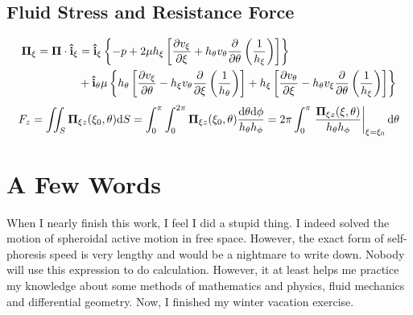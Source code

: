 \documentclass[fontsize=11pt, %
                             paper=a4, %
                             twoside, %
                             captions=tableheading,
                             index=totoc,
                             hyperref]{labbook}
\begin{document}
\subsection{Fluid Stress and Resistance Force}
\begin{equation}
\begin{aligned}
\mbox{\boldmath$ \Pi $}_\xi=\mbox{\boldmath$ \Pi $} \cdot \mathbf{\hat{i}}_\xi&=
\mathbf{\hat{i}}_\xi \left\{-p+2\mu h_\xi \left[\frac{\partial v_\xi}{\partial \xi}+h_\theta v_\theta \frac{\partial }{\partial \theta}\left(\frac{1}{h_\xi}\right)\right]\right\}\\
&+\mathbf{\hat{i}}_\theta \mu \left\{h_\theta\left[\frac{\partial v_\xi}{\partial \theta}-h_\xi v_\theta \frac{\partial }{\partial \xi}\left(\frac{1}{h_\theta}\right)\right]+h_\xi\left[\frac{\partial v_\theta}{\partial \xi}-h_\theta v_\xi \frac{\partial }{\partial \theta}\left(\frac{1}{h_\xi}\right)\right]\right\}
\end{aligned}
\end{equation}
\begin{equation}
F_z=\iint_S\mbox{\boldmath$ \Pi $}_{\xi z}(\xi_0,\theta)\mathrm{d}S=\int_0^\pi\int_0^{2\pi} \mbox{\boldmath$ \Pi $}_{\xi z}(\xi_0,\theta)\frac{\mathrm{d}\theta\mathrm{d}\phi}{h_\theta h_\phi}=2\pi\int_0^\pi \left.\frac{\mbox{\boldmath$ \Pi $}_{\xi z}(\xi,\theta)}{h_\theta h_\phi}\right|_{\xi=\xi_0}\mathrm{d}\theta
\end{equation}
\section{A Few Words}
When I nearly finish this work, I feel I did a stupid thing. I indeed solved the motion of spheroidal active motion in free space. However, the exact form of self-phoresis speed is very lengthy and would be a nightmare to write down. Nobody will use this expression to do calculation. However, it at least helps me practice my knowledge about some methods of mathematics and physics, fluid mechanics and differential geometry. Now, I finished my winter vacation exercise.





\end{document}
